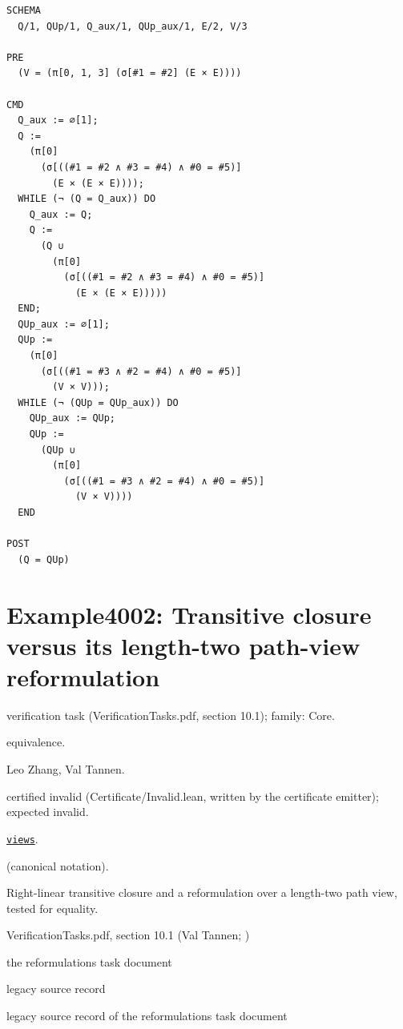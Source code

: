 \documentclass[10pt]{article}
\begin{document}
\begin{Verbatim}[fontsize=\tiny,breaklines=true,breakanywhere=true,frame=single,framesep=1.5mm]
SCHEMA
  Q/1, QUp/1, Q_aux/1, QUp_aux/1, E/2, V/3

PRE
  (V = (π[0, 1, 3] (σ[#1 = #2] (E × E))))

CMD
  Q_aux := ∅[1];
  Q :=
    (π[0]
      (σ[((#1 = #2 ∧ #3 = #4) ∧ #0 = #5)]
        (E × (E × E))));
  WHILE (¬ (Q = Q_aux)) DO
    Q_aux := Q;
    Q :=
      (Q ∪
        (π[0]
          (σ[((#1 = #2 ∧ #3 = #4) ∧ #0 = #5)]
            (E × (E × E)))))
  END;
  QUp_aux := ∅[1];
  QUp :=
    (π[0]
      (σ[((#1 = #3 ∧ #2 = #4) ∧ #0 = #5)]
        (V × V)));
  WHILE (¬ (QUp = QUp_aux)) DO
    QUp_aux := QUp;
    QUp :=
      (QUp ∪
        (π[0]
          (σ[((#1 = #3 ∧ #2 = #4) ∧ #0 = #5)]
            (V × V))))
  END

POST
  (Q = QUp)
\end{Verbatim}

\Needspace{0.45\textheight}

\section{Example4002: Transitive closure versus its length-two path-view reformulation}\label{case:Example4002}

\begin{description}[leftmargin=2.6cm,style=nextline,itemsep=1pt]

\item[Category] verification task (VerificationTasks.pdf, section 10.1); family: Core.

\item[Kind] equivalence.

\item[Contributors] Leo Zhang, Val Tannen.

\item[Status] certified invalid (Certificate/Invalid.lean, written by the certificate emitter); expected invalid.

\item[Tags] \hyperref[tag:views]{\texttt{views}}.

\item[Input]  (canonical notation).

\item[Summary] Right-linear transitive closure and a reformulation over a length-two path view, tested for equality.

\item[Sources] {\raggedright VerificationTasks.pdf, section 10.1 (Val Tannen; ) \par the reformulations task document \par legacy source record  \par legacy source record of the reformulations task document\par}

\end{description}
\end{document}
